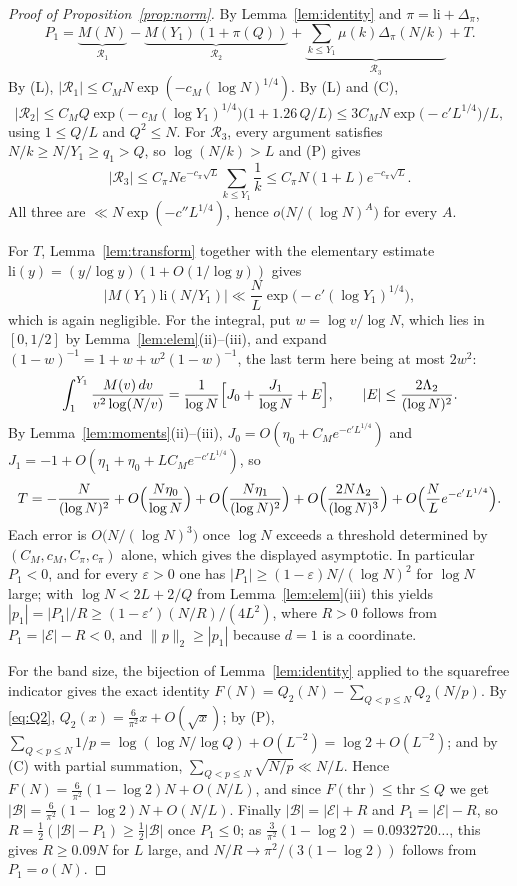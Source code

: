 \documentclass[11pt,a4paper]{article}
\theoremstyle{plain}
\theoremstyle{definition}
\theoremstyle{remark}
\newcommand{\thr}{\mathrm{thr}}
\newcommand{\li}{\mathrm{li}}
\newcommand{\vB}{\mathcal{E}}
\newcommand{\band}{\mathcal{B}}
\newcommand{\eps}{\varepsilon}
\begin{document}
\begin{proof}[Proof of Proposition~\ref{prop:norm}]
By Lemma~\ref{lem:identity} and $\pi=\li+\Delta_{\pi}$,
\[
  P_{1}=\underbrace{M(N)}_{\mathcal R_{1}}
   -\underbrace{M(Y_{1})(1+\pi(Q))}_{\mathcal R_{2}}
   +\underbrace{\sum_{k\le Y_{1}}\mu(k)\Delta_{\pi}(N/k)}_{\mathcal R_{3}}+T .
\]
By (L), $|\mathcal R_{1}|\le C_{M}N\exp(-c_{M}(\log N)^{1/4})$. By (L) and (C),
\[
  |\mathcal R_{2}|\le C_{M}Q\exp\bigl(-c_{M}(\log Y_{1})^{1/4}\bigr)
  \bigl(1+1.26\,Q/L\bigr)\le3C_{M}N\exp\bigl(-c'L^{1/4}\bigr)/L,
\]
using $1\le Q/L$ and $Q^{2}\le N$. For $\mathcal R_{3}$, every argument satisfies
$N/k\ge N/Y_{1}\ge q_{1}>Q$, so $\log(N/k)>L$ and (P) gives
\[
  |\mathcal R_{3}|\le C_{\pi}Ne^{-c_{\pi}\sqrt L}\!\!\sum_{k\le Y_{1}}\frac1k
  \le C_{\pi}N(1+L)e^{-c_{\pi}\sqrt L}.
\]
All three are $\ll N\exp(-c''L^{1/4})$, hence $o\bigl(N/(\log N)^{A}\bigr)$ for every $A$.

For $T$, Lemma~\ref{lem:transform} together with the elementary estimate
$\li(y)=(y/\log y)(1+O(1/\log y))$ gives
\[
  \bigl|M(Y_{1})\li(N/Y_{1})\bigr|\ll\frac NL\exp\bigl(-c'(\log Y_{1})^{1/4}\bigr),
\]
which is again negligible. For the integral, put $w=\log v/\log N$, which lies in $[0,1/2]$ by
Lemma~\ref{lem:elem}(ii)--(iii), and expand $(1-w)^{-1}=1+w+w^{2}(1-w)^{-1}$, the last term here being at
most $2w^{2}$:
\[
  \int_{1}^{Y_{1}}\frac{M(v)\,dv}{v^{2}\log(N/v)}
  =\frac1{\log N}\Bigl[J_{0}+\frac{J_{1}}{\log N}+E\Bigr],\qquad
  |E|\le\frac{2\Lambda_{2}}{(\log N)^{2}} .
\]
By Lemma~\ref{lem:moments}(ii)--(iii), $J_{0}=O(\eta_{0}+C_{M}e^{-c'L^{1/4}})$ and
$J_{1}=-1+O(\eta_{1}+\eta_{0}+LC_{M}e^{-c'L^{1/4}})$, so
\[
  T=-\frac N{(\log N)^{2}}+O\Bigl(\frac{N\eta_{0}}{\log N}\Bigr)
   +O\Bigl(\frac{N\eta_{1}}{(\log N)^{2}}\Bigr)
   +O\Bigl(\frac{2N\Lambda_{2}}{(\log N)^{3}}\Bigr)
   +O\Bigl(\frac NLe^{-c'L^{1/4}}\Bigr).
\]
Each error is $O\bigl(N/(\log N)^{3}\bigr)$ once $\log N$ exceeds a threshold determined by
$(C_{M},c_{M},C_{\pi},c_{\pi})$ alone, which gives the displayed asymptotic. In particular $P_{1}<0$, and
for every $\eps>0$ one has $|P_{1}|\ge(1-\eps)N/(\log N)^{2}$ for $\log N$ large; with
$\log N<2L+2/Q$ from Lemma~\ref{lem:elem}(iii) this yields
$|p_{1}|=|P_{1}|/R\ge(1-\eps')(N/R)/(4L^{2})$, where $R>0$ follows from $P_1=|\vB|-R<0$, and
$\|p\|_{2}\ge|p_{1}|$ because $d=1$ is a coordinate.

For the band size, the bijection of Lemma~\ref{lem:identity} applied to the squarefree indicator gives
the exact identity $F(N)=Q_{2}(N)-\sum_{Q<p\le N}Q_{2}(N/p)$. By \eqref{eq:Q2},
$Q_{2}(x)=\frac6{\pi^{2}}x+O(\sqrt x)$; by (P), $\sum_{Q<p\le N}1/p=\log(\log N/\log Q)+O(L^{-2})
=\log2+O(L^{-2})$; and by (C) with partial summation, $\sum_{Q<p\le N}\sqrt{N/p}\ll N/L$. Hence
$F(N)=\frac6{\pi^{2}}(1-\log2)N+O(N/L)$, and since $F(\thr)\le\thr\le Q$ we get
$|\band|=\frac6{\pi^{2}}(1-\log2)N+O(N/L)$. Finally $|\band|=|\vB|+R$ and $P_{1}=|\vB|-R$, so
$R=\frac12(|\band|-P_{1})\ge\frac12|\band|$ once $P_{1}\le0$; as
$\frac3{\pi^{2}}(1-\log2)=0.0932720\ldots$, this gives $R\ge0.09N$ for $L$ large, and
$N/R\to\pi^{2}/(3(1-\log2))$ follows from $P_{1}=o(N)$.
\end{proof}
\end{document}
